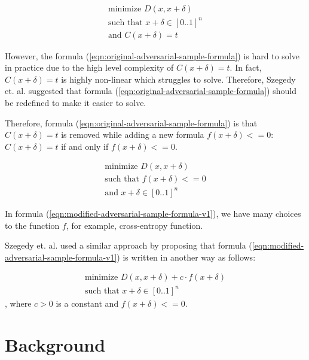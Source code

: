 \documentclass[12pt]{article}
\begin{document}
\begin{equation}
\begin{split}
\label{eqn:original-adversarial-sample-formula}
\text{minimize } D(x, x + \delta)
\\
\text{such that } x + \delta \in [0..1]^n
\\
\text{and } C(x+\delta) = t
\end{split}
\end{equation}

However, the formula (\ref{eqn:original-adversarial-sample-formula}) is hard to solve in practice due to the high level complexity of $C(x+\delta) = t$. In fact, $C(x+\delta) = t$ is highly non-linear which struggles to solve. Therefore, Szegedy et. al. suggested that formula (\ref{eqn:original-adversarial-sample-formula}) should be redefined to make it easier to solve.

Therefore, formula (\ref{eqn:original-adversarial-sample-formula}) is that  $C(x+\delta) = t$ is removed while adding a new formula $f(x+\delta) <= 0$: $C(x+\delta) = t$ if and only if $f(x+\delta) <= 0$.

\begin{equation}
\begin{split}
\label{eqn:modified-adversarial-sample-formula-v1}
\text{minimize } D(x, x + \delta)
\\
\text{such that } f(x+\delta) <= 0 
\\
\text{and } x + \delta \in [0..1]^n
\end{split}
\end{equation}

In formula (\ref{eqn:modified-adversarial-sample-formula-v1}), we have many choices to the function $f$, for example, cross-entropy function.

Szegedy et. al.  used a similar approach by proposing that formula (\ref{eqn:modified-adversarial-sample-formula-v1}) is written in another way as follows:

\begin{equation}
\begin{split}
\label{eqn:modified-adversarial-sample-formula-v2}
\text{minimize } D(x, x + \delta) + c \cdot f(x+\delta)
\\
\text{such that } x + \delta \in [0..1]^n
\end{split}
\end{equation}
, where $c > 0$ is a constant and $f(x+\delta) <= 0$.

\section{Background}
\end{document}
